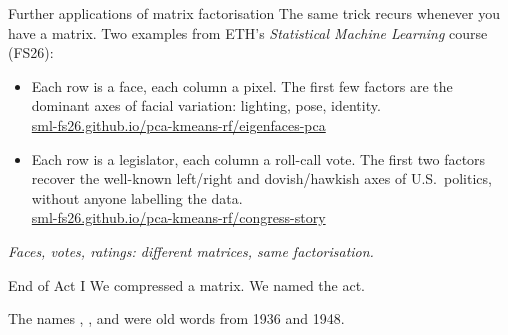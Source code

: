
\begin{frame}{Further applications of matrix factorisation}
  \footnotesize
  The same trick recurs whenever you have a matrix.  Two examples from
  ETH's \emph{Statistical Machine Learning} course (FS26):

  \medskip
  \begin{itemize}
    \setlength{\itemsep}{0.7em}
    \item {}
          Each row is a face, each column a pixel.  The first few
          factors are the dominant axes of facial variation: lighting,
          pose, identity.\\[0.2em]
          {\footnotesize\color{accentOxblood}%
            \href{https://sml-fs26.github.io/pca-kmeans-rf/eigenfaces-pca/index.html}%
                 {sml-fs26.github.io/pca-kmeans-rf/eigenfaces-pca}}
    \item {}
          Each row is a legislator, each column a roll-call vote.  The
          first two factors recover the well-known left/right and
          dovish/hawkish axes of U.S.\ politics, without anyone
          labelling the data.\\[0.2em]
          {\footnotesize\color{accentOxblood}%
            \href{https://sml-fs26.github.io/pca-kmeans-rf/congress-story/index.html\#scene-1}%
                 {sml-fs26.github.io/pca-kmeans-rf/congress-story}}
  \end{itemize}

  \medskip
  \begin{center}
    \scriptsize\itshape\color{mutedWarmGray}
    Faces, votes, ratings: different matrices, same factorisation.
  \end{center}
\end{frame}

\begin{frame}{End of Act I}
  We compressed a matrix. We named the act.

  \vspace{0.8em}

  The names , , and
   were old words from 1936 and 1948.
\end{frame}
